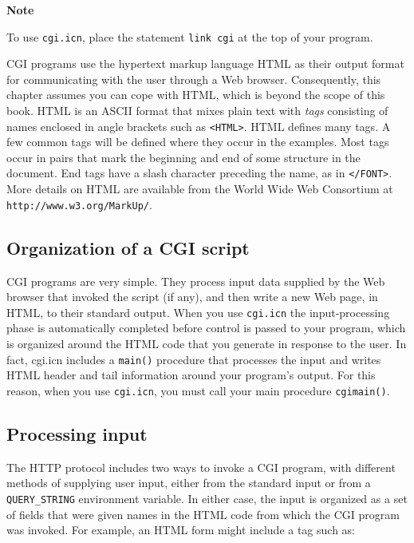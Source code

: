 {\sffamily\bfseries Note}

{\sffamily To use \texttt{cgi.icn}, place the statement \texttt{link cgi}
at the top of your program.

CGI programs use the hypertext markup language HTML as their output
format for communicating with the user through a Web browser.
Consequently, this chapter assumes you can cope with HTML, which is
beyond the scope of this book. HTML is an ASCII format that mixes plain
text with \textit{tags} consisting of names enclosed in angle brackets
such as \texttt{{\textless}HTML{\textgreater}}. HTML defines many tags.
A few common tags will be defined where they occur in the examples.
Most tags occur in pairs that mark the beginning and end of some
structure in the document. End tags have a slash character preceding
the name, as in \texttt{{\textless}/FONT{\textgreater}}. More details
on HTML are available from the World Wide Web Consortium at
\texttt{http://www.w3.org/MarkUp/}.

\subsection*{Organization of a CGI script}

CGI programs are very simple. They process input data supplied by the
Web browser that invoked the script (if any), and then write a new Web
page, in HTML, to their standard output. When you use \texttt{cgi.icn}
the input-processing phase is automatically completed before control is
passed to your program, which is organized around the HTML code that
you generate in response to the user. In fact, cgi.icn includes a
\texttt{main()} procedure that processes the input and writes HTML
header and tail information around your program's
output. For this reason,
when you use \texttt{cgi.icn}, you must call your main procedure
\texttt{cgimain()}.

\subsection*{Processing input}

The HTTP protocol includes two ways to invoke a CGI program,
with different methods of supplying user input, either from the
standard input or from a \texttt{QUERY\_STRING} environment variable.
In either case, the input is organized as a set of fields that were
given names in the HTML code from which the CGI program was invoked.
For example, an HTML form might include a tag such as: 

}

